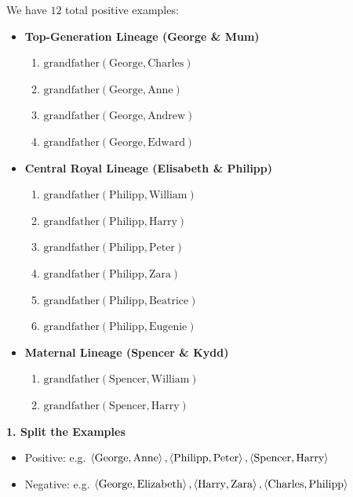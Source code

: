 We have $12$ total positive examples:
\begin{itemize}
    \item \textbf{Top-Generation Lineage (George \& Mum)}
    \begin{enumerate}
        \item $\text{grandfather}(\text{George}, \text{Charles})$
        \item $\text{grandfather}(\text{George}, \text{Anne})$
        \item $\text{grandfather}(\text{George}, \text{Andrew})$
        \item $\text{grandfather}(\text{George}, \text{Edward})$
    \end{enumerate}

    \item \textbf{Central Royal Lineage (Elisabeth \& Philipp)}
    \begin{enumerate}
        \item $\text{grandfather}(\text{Philipp}, \text{William})$
        \item $\text{grandfather}(\text{Philipp}, \text{Harry})$
        \item $\text{grandfather}(\text{Philipp}, \text{Peter})$
        \item $\text{grandfather}(\text{Philipp}, \text{Zara})$
        \item $\text{grandfather}(\text{Philipp}, \text{Beatrice})$
        \item $\text{grandfather}(\text{Philipp}, \text{Eugenie})$
    \end{enumerate}

    \item \textbf{Maternal Lineage (Spencer \& Kydd)}
    \begin{enumerate}
        \item $\text{grandfather}(\text{Spencer}, \text{William})$
        \item $\text{grandfather}(\text{Spencer}, \text{Harry})$
    \end{enumerate}
\end{itemize}

\textbf{1. Split the Examples}

\begin{itemize}
    \item Positive: e.g. $\left\langle \text{George}, \text{Anne} \right\rangle, \left\langle \text{Philipp}, \text{Peter} \right\rangle, \left\langle \text{Spencer}, \text{Harry} \right\rangle$
    \item Negative: e.g. $\left\langle \text{George}, \text{Elizabeth} \right\rangle, \left\langle \text{Harry}, \text{Zara} \right\rangle, \left\langle \text{Charles}, \text{Philipp} \right\rangle$
\end{itemize}

